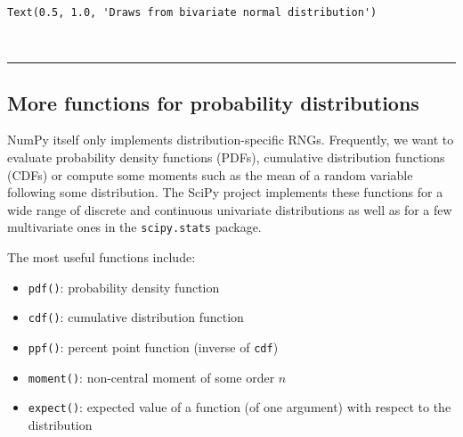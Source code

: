 \documentclass[10pt]{scrartcl}
\makeatletter
\providecommand{\tightlist}{%
      \setlength{\itemsep}{0pt}\setlength{\parskip}{0pt}}
\newcommand{\boxspacing}{\kern\kvtcb@left@rule\kern\kvtcb@boxsep}
\newcommand{\prompt}[4]{
        {\ttfamily\llap{{\color{#2}[#3]:\hspace{3pt}#4}}\vspace{-\baselineskip}}
    }
\makeatother
\begin{document}
            \begin{tcolorbox}[breakable, size=fbox, boxrule=.5pt, pad at break*=1mm, opacityfill=0]
\prompt{Out}{outcolor}{12}{\boxspacing}
\begin{Verbatim}[commandchars=\\\{\}]
Text(0.5, 1.0, 'Draws from bivariate normal distribution')
\end{Verbatim}
\end{tcolorbox}
        
    \begin{center}
    \end{center}
    { \hspace*{\fill} \\}
    
    \begin{center}\rule{0.5\linewidth}{0.5pt}\end{center}

\hypertarget{more-functions-for-probability-distributions}{%
\subsection{More functions for probability
distributions}\label{more-functions-for-probability-distributions}}

NumPy itself only implements distribution-specific RNGs. Frequently, we
want to evaluate probability density functions (PDFs), cumulative
distribution functions (CDFs) or compute some moments such as the mean
of a random variable following some distribution. The SciPy project
implements these functions for a wide range of discrete and continuous
univariate distributions as well as for a few multivariate ones in the
\texttt{scipy.stats} package.

The most useful functions include:

\begin{itemize}
\tightlist
\item
  \texttt{pdf()}: probability density function
\item
  \texttt{cdf()}: cumulative distribution function
\item
  \texttt{ppf()}: percent point function (inverse of \texttt{cdf})
\item
  \texttt{moment()}: non-central moment of some order \(n\)
\item
  \texttt{expect()}: expected value of a function (of one argument) with
  respect to the distribution
\end{itemize}
\end{document}
